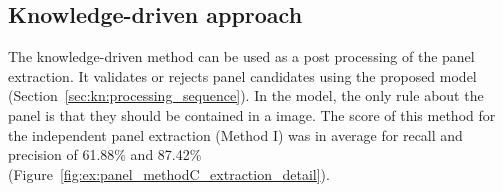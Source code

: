 

\subsection{Knowledge-driven approach} %
The knowledge-driven method can be used as a post processing of the panel extraction.
It validates or rejects panel candidates using the proposed model (Section~\ref{sec:kn:processing_sequence}).
In the model, the only rule about the panel is that they should be contained in a image.
The score of this method for the independent panel extraction (Method I) was in average for recall and precision of 61.88\% and 87.42\% (Figure~\ref{fig:ex:panel_methodC_extraction_detail}).



